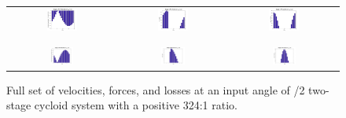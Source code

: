 \begin{figure}[h]
   \centering
   \begin{tabular}{ccc}
	   \includegraphics[width=0.30\textwidth]{fig/double_1_vel_pi_2} &
	   \includegraphics[width=0.30\textwidth]{fig/double_1_forces_pi_2} &
	   \includegraphics[width=0.30\textwidth]{fig/double_1_losses_pi_2} \\
	   \\
	   \hline
	   \\
	   \includegraphics[width=0.23\textwidth]{fig/double_2_vel_pi_2} &
	   \includegraphics[width=0.23\textwidth]{fig/double_2_forces_pi_2} &
	   \includegraphics[width=0.23\textwidth]{fig/double_2_losses_pi_2} \\
   \end{tabular}
   \caption{Full set of velocities, forces, and losses at an input angle of \textpi/2 two-stage cycloid system with a positive 324:1 ratio.}
   \label{fig:two_stage_forces_pos}
\end{figure}

